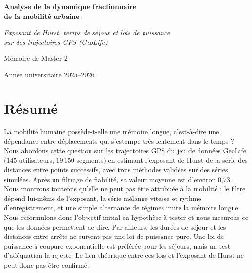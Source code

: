 \documentclass[11pt,a4paper]{article}
\renewcommand{\_}{\textunderscore\penalty0\hspace{0pt}}
\begin{document}
\begin{titlepage}
\centering
\vspace*{5cm}
{\LARGE\bfseries Analyse de la dynamique fractionnaire\\de la mobilité urbaine\par}
\vspace{1cm}
{\large\itshape Exposant de Hurst, temps de séjour et lois de puissance\\
sur des trajectoires GPS (GeoLife)\par}
\vspace{2.5cm}
{\large Mémoire de Master 2\par}
\vspace{0.4cm}
{\large Année universitaire 2025--2026\par}
\vfill
\end{titlepage}


\section*{Résumé}

La mobilité humaine possède-t-elle une mémoire longue, c'est-à-dire une dépendance entre
déplacements qui s'estompe très lentement dans le temps ? Nous abordons cette question sur
les trajectoires GPS du jeu de données GeoLife (145 utilisateurs, 19\,150 segments) en
estimant l'exposant de Hurst de la série des distances entre points successifs, avec trois
méthodes validées sur des séries simulées. Après un filtrage de fiabilité, sa valeur
moyenne est d'environ 0,73. Nous montrons toutefois qu'elle ne peut pas être attribuée à la
mobilité : le filtre dépend lui-même de l'exposant, la série mélange vitesse et rythme
d'enregistrement, et une simple alternance de régimes imite la mémoire longue. Nous
reformulons donc l'objectif initial en hypothèse à tester et nous mesurons ce que les
données permettent de dire. Par ailleurs, les durées de séjour et les distances entre
arrêts ne suivent pas une loi de puissance pure. Une loi de puissance à coupure
exponentielle est préférée pour les séjours, mais un test d'adéquation la rejette. Le lien
théorique entre ces lois et l'exposant de Hurst ne peut donc pas être confirmé.
\end{document}
